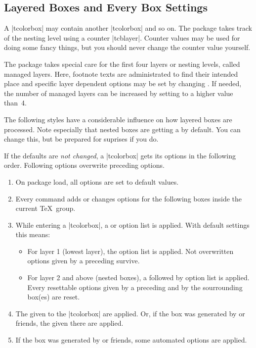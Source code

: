 \clearpage
\subsection{Layered Boxes and Every Box Settings}\label{subsec:everybox}
A |tcolorbox| may contain another |tcolorbox| and so on. The package
takes track of the nesting level using a counter |tcblayer|. Counter values
may be used for doing some fancy things, but you should never change
the counter value yourself.

The package takes special care for the first four layers or nesting levels,
called managed layers.
Here, footnote texts are administrated to find their intended place
and specific layer dependent options may be set by changing
.
If needed, the number of managed layers can be increased by setting
 to a higher value than~4.

The following styles have a considerable influence on how layered boxes
are processed. Note especially that nested boxes are getting a
 by default. You can change this, but be prepared for
suprises if you do.

If the defaults are \emph{not changed}, a |tcolorbox| gets its options
in the following order. Following options overwrite preceding options.
\begin{enumerate}
\item On package load, all options are set to default values.
\item Every  command adds or changes options for the following boxes
  inside the current \TeX\ group.
\item While entering a |tcolorbox|, a  or
   option list is applied.
  With default settings this means:
  \begin{itemize}
  \item For layer 1 (lowest layer), the  option list is applied.
    Not overwritten options given by a preceding  survive.
  \item For layer 2 and above (nested boxes), a  followed by
     option list is applied.
    Every resettable options given by a preceding 
    and by the sourrounding box(es) are reset.
  \end{itemize}
\item The  given to the |tcolorbox| are applied.
  Or, if the box was generated by  or friends,
  the  given there are applied.
\item If the box was generated by  or friends,
  some automated options are applied.
\end{enumerate}


